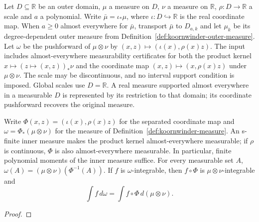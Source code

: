 \begin{supporting}
\begin{definition}
\label{def:koornwinder-measure}
\leanok
Let $D\subseteq\mathbb R$ be an outer domain, $\mu$ a measure on $D$,
$\nu$ a measure on $\mathbb R$, $\rho:D\to\mathbb R$ a scale and $a$ a
polynomial. Write $\bar\mu=\iota_*\mu$, where $\iota:D\hookrightarrow\mathbb R$
is the real coordinate map. When $a\ge0$ almost everywhere for $\bar\mu$,
transport $\bar\mu$ to $D_{a,k}$ and let $\mu_k$ be its degree-dependent
outer measure from Definition~\ref{def:koornwinder-outer-measure}. Let $\omega$ be
the pushforward of $\mu\otimes\nu$ by $(x,z)\mapsto(\iota(x),\rho(x)z)$.
The input includes almost-everywhere measurability certificates for both
the product kernel $x\mapsto(z\mapsto(x,z))_*\nu$ and the coordinate map
$(x,z)\mapsto(x,\rho(x)z)$ under $\mu\otimes\nu$.
The scale may be discontinuous, and no interval support condition is imposed.
Global scales use $D=\mathbb R$. A real measure supported almost everywhere
in a measurable $D$ is represented by its restriction to that domain; its
coordinate pushforward recovers the original measure.

\end{definition}


\begin{theorem}
\label{thm:koornwinder-measure-characterisation}
\leanok
Write $\Phi(x,z)=(\iota(x),\rho(x)z)$ for the separated coordinate map
and $\omega=\Phi_*(\mu\otimes\nu)$ for the measure of
Definition~\ref{def:koornwinder-measure}.
An s-finite inner measure makes the product kernel almost-everywhere measurable;
if $\rho$ is continuous, $\Phi$ is also almost-everywhere measurable.
In particular, finite polynomial moments of the inner measure suffice.
For every measurable set $A$,
$\omega(A)=(\mu\otimes\nu)(\Phi^{-1}(A))$.
If $f$ is $\omega$-integrable, then $f\circ\Phi$ is $\mu\otimes\nu$-integrable and
\[
 \int f\,d\omega=\int f\circ\Phi\,d(\mu\otimes\nu).
\]
\end{theorem}
\begin{proof}
\leanok
\end{proof}


\end{supporting}
